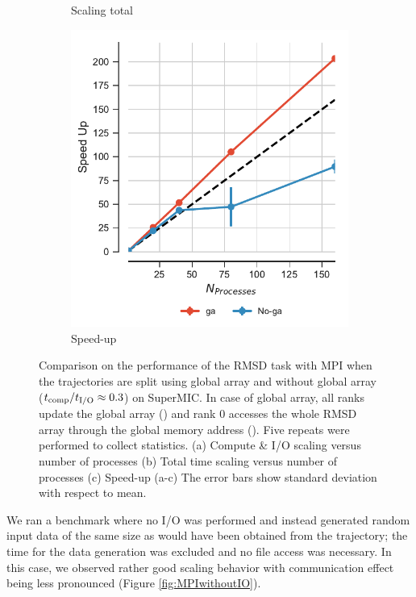 \begin{figure}[ht!]
\begin{subfigure}{.3\textwidth}
  \caption{Scaling total}
  \label{fig:MPItottime-SuperMIC}
\end{subfigure}
\hfill
\begin{subfigure}{.3\textwidth}
  \includegraphics[width=\linewidth]{figures/Comparison_Speed_UP_traj_splitting-SuperMIC.pdf}
  \caption{Speed-up}
  \label{fig:MPIspeedup-SuperMIC}
\end{subfigure}

\caption{Comparison on the performance of the RMSD task with MPI when the trajectories are split using global array and without global array (${t}_{\text{comp}}/{t}_{\text{I/O}} \approx 0.3$) on SuperMIC.
In case of global array, all ranks update the global array () and rank 0 accesses the whole RMSD array through the global memory address ().
Five repeats were performed to collect statistics. (a) Compute \& I/O scaling versus number of processes (b) Total time scaling versus number of processes (c) Speed-up (a-c) The error bars show standard deviation with respect to mean.}
\label{fig:MPIwithIO-split-SuperMIC}
\end{figure}

We ran a benchmark where no I/O was performed and instead generated random input data of the same size as would have been obtained from the trajectory; the time for the data generation was excluded and no file access was necessary. 
In this case, we observed rather good scaling behavior with communication effect being less pronounced (Figure \ref{fig:MPIwithoutIO}).

